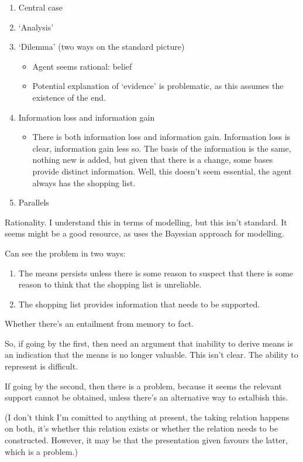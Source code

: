 \documentclass[10pt]{article}
\begin{document}
\begin{enumerate}
\item Central case
\item `Analysis'
\item `Dilemma' (two ways on the standard picture)
  \begin{itemize}
  \item Agent seems rational: belief
  \item Potential explanation of `evidence' is problematic, as this assumes the existence of the end.
  \end{itemize}
\item Information loss and information gain
  \begin{itemize}
  \item There is both information loss and information gain.
    Information loss is clear, information gain less so.
    The basis of the information is the same, nothing new is added, but given that there is a change, some bases provide distinct information.
    Well, this doesn't seem essential, the agent always has the shopping list.
  \end{itemize}
\item Parallels
\end{enumerate}

Rationality.
I understand this in terms of modelling, but this isn't standard.
It seems \citeauthor{Titelbaum:2013aa} might be a good resource, as \citeauthor{Titelbaum:2013aa} uses the Bayesian approach for modelling.


Can see the problem in two ways:
\begin{enumerate}
\item The means persists unless there is some reason to suspect that there is some reason to think that the shopping list is unreliable.
\item The shopping list provides information that needs to be supported.
\end{enumerate}

Whether there's an entailment from memory to fact.

So, if going by the first, then need an argument that inability to derive means is an indication that the means is no longer valuable.
This isn't clear.
The ability to represent is difficult.

If going by the second, then there is a problem, because it seems the relevant support cannot be obtained, unless there's an alternative way to estalbish this.

(I don't think I'm comitted to anything at present, the taking relation happens on both, it's whether this relation exists or whether the relation needs to be constructed.
However, it may be that the presentation given favours the latter, which is a problem.)
\end{document}
